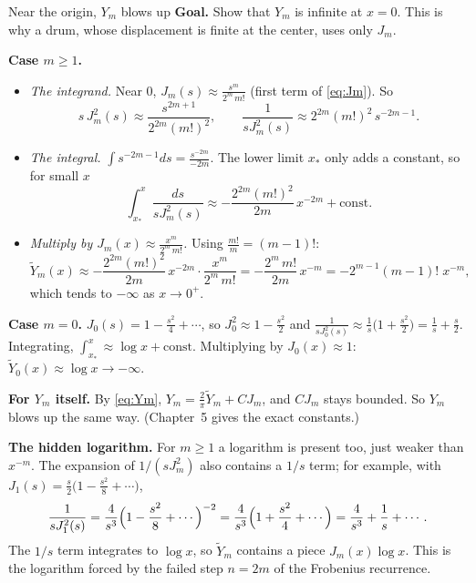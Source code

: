 \documentclass[11pt]{beamer}
\begin{document}
\begin{frame}[allowframebreaks=1.00]{Near the origin, $Y_m$ blows up}
\footnotesize
\textbf{Goal.} Show that \(Y_m\) is infinite at \(x=0\). This is why a drum, whose displacement is finite at
the center, uses only \(J_m\).

\textbf{Case \(m\ge1\).}
\begin{itemize}
  \item \emph{The integrand.} Near \(0\), \(J_m(s)\approx\frac{s^m}{2^m\,m!}\) (first term of \eqref{eq:Jm}). So
        \[
          s\,J_m^2(s)\approx\frac{s^{2m+1}}{2^{2m}(m!)^2},\qquad
          \frac{1}{sJ_m^2(s)}\approx2^{2m}(m!)^2\,s^{-2m-1}.
        \]
  \item \emph{The integral.} \(\int s^{-2m-1}ds=\frac{s^{-2m}}{-2m}\). The lower limit \(x_*\) only adds a
        constant, so for small \(x\)
        \[
         \int_{x_*}^{x}\frac{ds}{sJ_m^2(s)}\approx-\frac{2^{2m}(m!)^2}{2m}\,x^{-2m}+\text{const}.
        \]
  \item \emph{Multiply by \(J_m(x)\approx\frac{x^m}{2^m\,m!}\).} Using \(\frac{m!}{m}=(m-1)!\):
        \[
         \widetilde Y_m(x)\approx-\frac{2^{2m}(m!)^2}{2m}\,x^{-2m}\cdot\frac{x^m}{2^m\,m!}
         =-\frac{2^{m}\,m!}{2m}\,x^{-m}
         =-2^{m-1}(m-1)!\;x^{-m},
        \]
        which tends to \(-\infty\) as \(x\to0^+\).
\end{itemize}
\par\framebreak\par
\textbf{Case \(m=0\).} \(J_0(s)=1-\frac{s^2}{4}+\cdots\), so \(J_0^2\approx1-\frac{s^2}2\) and
\(\frac{1}{sJ_0^2(s)}\approx\frac1s\bigl(1+\frac{s^2}{2}\bigr)=\frac1s+\frac s2\). Integrating,
\(\int_{x_*}^x\approx\log x+\text{const}\). Multiplying by \(J_0(x)\approx1\):
\(\widetilde Y_0(x)\approx\log x\to-\infty\).

\textbf{For \(Y_m\) itself.} By \eqref{eq:Ym}, \(Y_m=\frac2\pi\widetilde Y_m+CJ_m\), and \(CJ_m\) stays bounded. So \(Y_m\)
blows up the same way. (Chapter~5 gives the exact constants.)

\textbf{The hidden logarithm.} For \(m\ge1\) a logarithm is present too, just weaker than \(x^{-m}\). The
expansion of \(1/(sJ_m^2)\) also contains a \(1/s\) term; for example, with
\(J_1(s)=\frac s2\bigl(1-\frac{s^2}{8}+\cdots\bigr)\),
\[
 \frac{1}{sJ_1^2(s)}=\frac{4}{s^3}\Bigl(1-\frac{s^2}{8}+\cdots\Bigr)^{-2}
 =\frac4{s^3}\Bigl(1+\frac{s^2}{4}+\cdots\Bigr)=\frac4{s^3}+\frac1s+\cdots .
\]
The \(1/s\) term integrates to \(\log x\), so \(\widetilde Y_m\) contains a piece \(J_m(x)\log x\). This is the
logarithm forced by the failed step \(n=2m\) of the Frobenius recurrence.
\end{frame}
\end{document}
